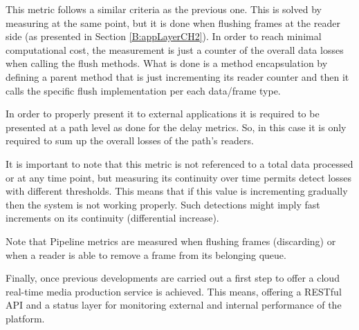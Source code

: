 This metric follows a similar criteria as the previous one. This is solved by measuring at the same point, but it is done when flushing frames at the reader side (as presented in Section \ref{B:appLayerCH2}). In order to reach minimal computational cost, the measurement is just a counter of the overall data losses when calling the flush methods. What is done is a method encapsulation by defining a parent method that is just incrementing its reader counter and then it calls the specific flush implementation per each data/frame type.

In order to properly present it to external applications it is required to be presented at a path level as done for the delay metrics. So, in this case it is only required to sum up the overall losses of the path's readers.

It is important to note that this metric is not referenced to a total data processed or at any time point, but measuring its continuity over time permits detect losses with different thresholds. This means that if this value is incrementing gradually then the system is not working properly. Such detections might imply fast increments on its continuity (differential increase). 

Note that Pipeline metrics are measured when flushing frames (discarding) or when a reader is able to remove a frame from its belonging queue. 

Finally, once previous developments are carried out a first step to offer a cloud real-time media production service is achieved. This means, offering a RESTful API and a status layer for monitoring external and internal performance of the platform.